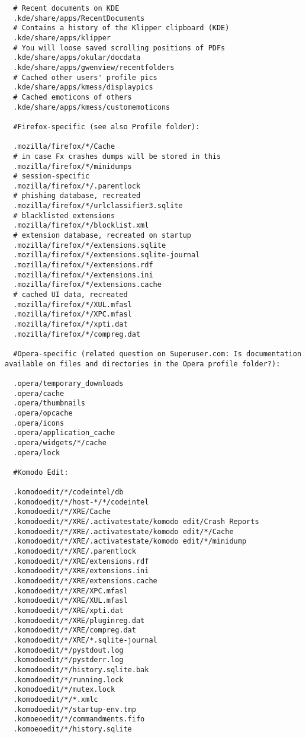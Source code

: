 \documentclass[12pt]{article}
\begin{document}
\begin{Verbatim}
  # Recent documents on KDE
  .kde/share/apps/RecentDocuments
  # Contains a history of the Klipper clipboard (KDE)
  .kde/share/apps/klipper
  # You will loose saved scrolling positions of PDFs
  .kde/share/apps/okular/docdata
  .kde/share/apps/gwenview/recentfolders
  # Cached other users' profile pics
  .kde/share/apps/kmess/displaypics
  # Cached emoticons of others
  .kde/share/apps/kmess/customemoticons

  #Firefox-specific (see also Profile folder):

  .mozilla/firefox/*/Cache
  # in case Fx crashes dumps will be stored in this
  .mozilla/firefox/*/minidumps
  # session-specific
  .mozilla/firefox/*/.parentlock
  # phishing database, recreated
  .mozilla/firefox/*/urlclassifier3.sqlite
  # blacklisted extensions
  .mozilla/firefox/*/blocklist.xml
  # extension database, recreated on startup
  .mozilla/firefox/*/extensions.sqlite
  .mozilla/firefox/*/extensions.sqlite-journal
  .mozilla/firefox/*/extensions.rdf
  .mozilla/firefox/*/extensions.ini
  .mozilla/firefox/*/extensions.cache
  # cached UI data, recreated
  .mozilla/firefox/*/XUL.mfasl
  .mozilla/firefox/*/XPC.mfasl
  .mozilla/firefox/*/xpti.dat
  .mozilla/firefox/*/compreg.dat

  #Opera-specific (related question on Superuser.com: Is documentation available on files and directories in the Opera profile folder?):

  .opera/temporary_downloads
  .opera/cache
  .opera/thumbnails
  .opera/opcache
  .opera/icons
  .opera/application_cache
  .opera/widgets/*/cache
  .opera/lock

  #Komodo Edit:

  .komodoedit/*/codeintel/db
  .komodoedit/*/host-*/*/codeintel
  .komodoedit/*/XRE/Cache
  .komodoedit/*/XRE/.activatestate/komodo edit/Crash Reports
  .komodoedit/*/XRE/.activatestate/komodo edit/*/Cache
  .komodoedit/*/XRE/.activatestate/komodo edit/*/minidump
  .komodoedit/*/XRE/.parentlock
  .komodoedit/*/XRE/extensions.rdf
  .komodoedit/*/XRE/extensions.ini
  .komodoedit/*/XRE/extensions.cache
  .komodoedit/*/XRE/XPC.mfasl
  .komodoedit/*/XRE/XUL.mfasl
  .komodoedit/*/XRE/xpti.dat
  .komodoedit/*/XRE/pluginreg.dat
  .komodoedit/*/XRE/compreg.dat
  .komodoedit/*/XRE/*.sqlite-journal
  .komodoedit/*/pystdout.log
  .komodoedit/*/pystderr.log
  .komodoedit/*/history.sqlite.bak
  .komodoedit/*/running.lock
  .komodoedit/*/mutex.lock
  .komodoedit/*/*.xmlc
  .komodoedit/*/startup-env.tmp
  .komoeoedit/*/commandments.fifo
  .komoeoedit/*/history.sqlite


\end{Verbatim}
\end{document}
